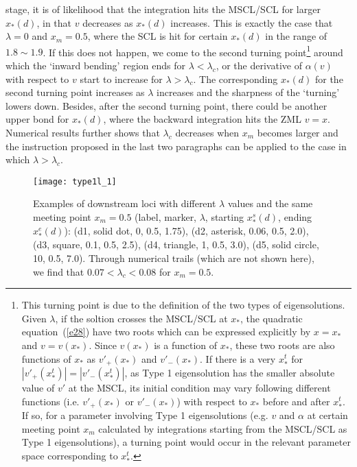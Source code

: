 \documentclass[fleqn,usenatbib]{mnras}
\begin{document}
stage, it is of likelihood that the integration hits the MSCL/SCL for larger $x_{*}(d)$, in that $v$ decreases as $x_{*}(d)$ increases. This is exactly the case that $\lambda=0$ and $x_{m}=0.5$, where the SCL is hit for certain $x_{*}(d)$ in the range of $1.8\sim 1.9$. If this does not happen, we come to the second turning point\footnote{This turning point is due to the definition of the two types of eigensolutions. Given $\lambda$, if the soltion crosses the MSCL/SCL at $x_{*}$, the quadratic equation~(\ref{e28}) have two roots which can be expressed explicitly by $x=x_{*}$ and $v=v(x_{*})$. Since $v(x_{*})$ is a function of $x_{*}$, these two roots are also functions of $x_{*}$ as $v'_{+}(x_{*})$ and $v'_{-}(x_{*})$. If there is a very $x_{*}^{t}$ for $|v'_{+}(x_{*}^{t})|=|v'_{-}(x_{*}^{t})|$, as Type 1 eigensolution has the smaller absolute value of $v'$ at the MSCL, its initial condition may vary following different functions (i.e. $v'_{+}(x_{*})$ or $v'_{-}(x_{*})$) with respect to $x_{*}$ before and after $x_{*}^{t}$. If so, for a parameter involving Type 1 eigensolutions (e.g. $v$ and $\alpha$ at certain meeting point $x_{m}$ calculated by integrations starting from the MSCL/SCL as Type 1 eigensolutions), a turning point would occur in the relevant parameter space corresponding to $x_{*}^{t}$.\label{f1}} around which the `inward bending' region ends for $\lambda<\lambda_{c}$, or the derivative of $\alpha(v)$ with respect to $v$ start to increase for $\lambda>\lambda_{c}$. The corresponding $x_{*}(d)$ for the second turning point increases as $\lambda$ increases and the sharpness of the `turning' lowers down. Besides, after the second turning point, there could be another upper bond for $x_{*}(d)$, where the backward integration hits the ZML $v=x$. Numerical results further shows that $\lambda_{c}$ decreases when $x_{m}$ becomes larger and the instruction proposed in the last two paragraphs can be applied to the case in which $\lambda>\lambda_{c}$. 

\begin{figure}
\centering
\texttt{[image: type1l\_1]}
\caption{Examples of downstream loci with different $\lambda$ values and the same meeting point $x_{m}=0.5$ (label, marker, $\lambda$, starting $x_{*}^{s}(d)$, ending $x_{*}^{e}(d)$): (d1, solid dot, 0, 0.5, 1.75), (d2, asterisk, 0.06, 0.5, 2.0), (d3, square, 0.1, 0.5, 2.5), (d4, triangle, 1, 0.5, 3.0), (d5, solid circle, 10, 0.5, 7.0). Through numerical trails (which are not shown here), we find that $0.07<\lambda_{c}<0.08$ for $x_{m}=0.5$.}
\label{lc3}
\end{figure}
\end{document}

